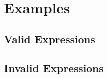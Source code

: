 \documentclass{article}
\begin{document}
%
%
%
%




\newpage
\section*{Examples}
\subsection*{Valid Expressions}


\subsection*{Invalid Expressions}
\end{document}
